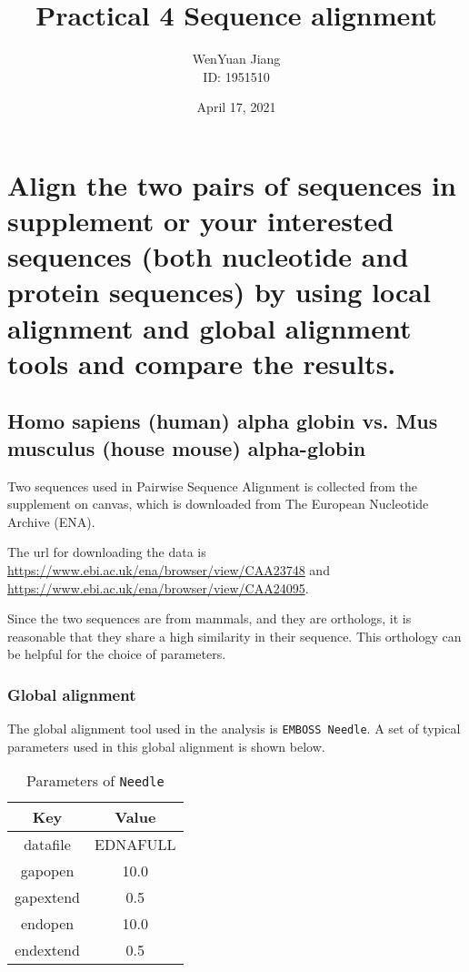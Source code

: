 \documentclass[en,black,10pt,normal]{elegantnote}
\title{Practical 4 Sequence alignment}
\author{WenYuan Jiang\\ID: 1951510}
\institute{School of Life Science, Tongji University}
\date{April 17, 2021}
\newcommand{\upcite}[1]{\textsuperscript{\textsuperscript{\cite{#1}}}}
\begin{document}
\maketitle

\section{Align the two pairs of sequences in supplement or your interested sequences (both nucleotide and protein sequences) by using local alignment and global alignment tools and compare the results.}

\subsection{Homo sapiens (human) alpha globin vs. Mus musculus (house mouse) alpha-globin}

Two sequences used in Pairwise Sequence Alignment is collected from the supplement on canvas,
which is downloaded from The European Nucleotide Archive (ENA).

The url for downloading the data is \url{https://www.ebi.ac.uk/ena/browser/view/CAA23748} and \url{https://www.ebi.ac.uk/ena/browser/view/CAA24095}.

Since the two sequences are from mammals, and they are orthologs, it is reasonable that 
they share a high similarity in their sequence. 
This orthology can be helpful for the choice of parameters.


\subsubsection{Global alignment}
The global alignment tool used in the analysis is \texttt{EMBOSS Needle}. \upcite{likic2008needleman}
A set of typical parameters used in this global alignment is shown below.
\begin{table}[H]
    \caption{Parameters of \texttt{Needle}}
    \centering
    \begin{tabular}{cc}
        \toprule
        Key&Value\\
        \midrule
        datafile&EDNAFULL\\
        gapopen&10.0\\
        gapextend&0.5\\
        endopen&10.0\\
        endextend&0.5\\
        \bottomrule
    \end{tabular}
\end{table}
\end{document}
